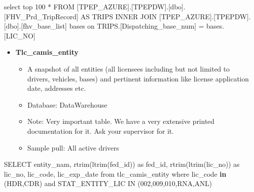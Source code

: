 \documentclass[
]{book}
\newenvironment{Shaded}{\begin{snugshade}}{\end{snugshade}}
\newcommand{\ControlFlowTok}[1]{\textcolor[rgb]{0.13,0.29,0.53}{\textbf{#1}}}
\newcommand{\DecValTok}[1]{\textcolor[rgb]{0.00,0.00,0.81}{#1}}
\newcommand{\FunctionTok}[1]{\textcolor[rgb]{0.00,0.00,0.00}{#1}}
\newcommand{\NormalTok}[1]{#1}
\newcommand{\OtherTok}[1]{\textcolor[rgb]{0.56,0.35,0.01}{#1}}
\newcommand{\SpecialCharTok}[1]{\textcolor[rgb]{0.00,0.00,0.00}{#1}}
\newcommand{\StringTok}[1]{\textcolor[rgb]{0.31,0.60,0.02}{#1}}
\providecommand{\tightlist}{%
  \setlength{\itemsep}{0pt}\setlength{\parskip}{0pt}}
\begin{document}
\begin{Shaded}
\begin{Highlighting}[]
\NormalTok{select top }\DecValTok{100} \SpecialCharTok{*}
\NormalTok{    FROM}
\NormalTok{     [TPEP\_AZURE].[TPEPDW].[dbo].[FHV\_Prd\_TripRecord] }
\NormalTok{    AS TRIPS }
\NormalTok{    INNER JOIN [TPEP\_AZURE].[TPEPDW].[dbo].[fhv\_base\_list] bases on }
\NormalTok{    TRIPS.[Dispatching\_base\_num] }\OtherTok{=}\NormalTok{ bases.[LIC\_NO] }
\end{Highlighting}
\end{Shaded}

\begin{itemize}
\tightlist
\item
  \textbf{Tlc\_camis\_entity}

  \begin{itemize}
  \tightlist
  \item
    A snapshot of all entities (all licensees including but not limited to drivers, vehicles, bases) and pertinent information like license application date, addresses etc.
  \item
    Database: DataWarehouse
  \item
    Note: Very important table. We have a very extensive printed documentation for it. Ask your supervisor for it.
  \item
    Sample pull: All active drivers
  \end{itemize}
\end{itemize}

\begin{Shaded}
\begin{Highlighting}[]
\NormalTok{SELECT entity\_nam, }\FunctionTok{rtrim}\NormalTok{(}\FunctionTok{ltrim}\NormalTok{(fed\_id)) as fed\_id, }\FunctionTok{rtrim}\NormalTok{(}\FunctionTok{ltrim}\NormalTok{(lic\_no)) as lic\_no, lic\_code, lic\_exp\_date}
\NormalTok{     from tlc\_camis\_entity}
\NormalTok{     where lic\_code }\ControlFlowTok{in}\NormalTok{ (}\StringTok{\textquotesingle{}HDR\textquotesingle{}}\NormalTok{,}\StringTok{\textquotesingle{}CDR\textquotesingle{}}\NormalTok{) and STAT\_ENTITY\_LIC }\FunctionTok{IN}\NormalTok{ (}\StringTok{\textquotesingle{}002\textquotesingle{}}\NormalTok{,}\StringTok{\textquotesingle{}009\textquotesingle{}}\NormalTok{,}\StringTok{\textquotesingle{}010\textquotesingle{}}\NormalTok{,}\StringTok{\textquotesingle{}RNA\textquotesingle{}}\NormalTok{,}\StringTok{\textquotesingle{}ANL\textquotesingle{}}\NormalTok{)}
\end{Highlighting}
\end{Shaded}
\end{document}
